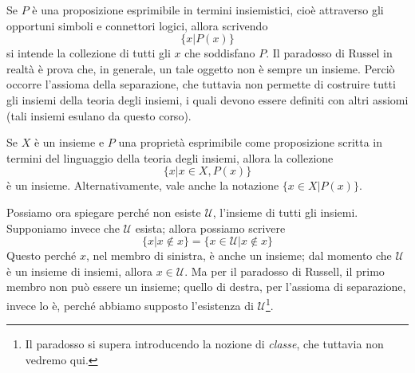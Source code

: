 \documentclass[oneside]{book}
\theoremstyle{remark}
\begin{document}
Se $P$ è una proposizione esprimibile
in termini insiemistici, cioè attraverso gli opportuni simboli e connettori
logici, allora scrivendo
\[\{x|P(x)\}\]
si intende la collezione di tutti gli $x$ che soddisfano $P$. Il paradosso
di Russel in realtà è prova che, in generale, un tale oggetto non è
sempre un insieme. Perciò occorre l'assioma della separazione, che tuttavia
non permette di costruire tutti gli insiemi della teoria degli insiemi, i
quali devono essere definiti con altri assiomi
(tali insiemi esulano da questo corso).

\begin{tcolorbox}[colback=yellow!30, colframe=yellow!30!black, title={Assioma della separazione}]
Se $X$ è un insieme e $P$ una proprietà esprimibile come proposizione
scritta in termini del linguaggio della teoria degli insiemi, allora
la collezione
\[ \{x|x\in X, P(x)\} \]
è un insieme. Alternativamente, vale anche la notazione $\{x\in X|P(x)\}$.
\end{tcolorbox}

Possiamo ora spiegare perché non esiste $\mathcal{U}$, l'insieme di tutti
gli insiemi. Supponiamo invece che $\mathcal{U}$ esista; allora possiamo
scrivere
\[ \{x|x\not\in x\} = \{x\in\mathcal{U}|x\not\in x\} \]
Questo perché $x$, nel membro di sinistra, è anche un insieme; dal momento
che $\mathcal{U}$ è un insieme di insiemi, allora $x\in\mathcal{U}$.
Ma per il paradosso di Russell, il primo membro non può essere un insieme;
quello di destra, per l'assioma di separazione, invece lo è, perché abbiamo
supposto l'esistenza di $\mathcal{U}$\footnote{Il paradosso si supera
introducendo la nozione di \textit{classe}, che tuttavia non vedremo qui.}.
\end{document}
